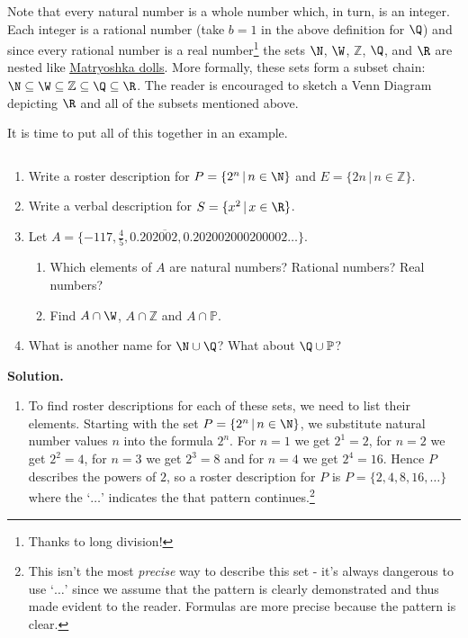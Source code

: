 Note that every natural number is a whole number which, in turn, is an integer.   Each integer is a rational number (take $b =1$ in the above definition for $\Q$) and since every rational number is a real number\footnote{Thanks to long division!}  the sets $\N$, $\W$, $\mathbb Z$, $\Q$, and  $\R$ are nested like \href{http://en.wikipedia.org/wiki/Matryoshka_doll}{\underline{Matryoshka dolls}}. More formally, these sets form a subset chain:  $\N \subseteq \W \subseteq \mathbb Z \subseteq \Q \subseteq \R$.  The reader is encouraged to sketch a Venn Diagram depicting $\R$ and all of the subsets mentioned above.  

It is time to put all of this together in an example.

\begin{ex} \label{numbersetex}   $~$

\begin{enumerate}

\item  Write a roster description for $P = \{ 2^{n} \, | \, n \in \N \}$  and $E = \{ 2n \, | \, n \in \mathbb Z \}$.

\item Write a verbal description for $S = \{ x^2 \, | \, x \in \R \}$.

\item Let $A = \{-117, \frac{4}{5}, 0.20\overline{2002}, 0.202002000200002 \ldots\}$. 

\begin{enumerate}

\item Which elements of $A$ are natural numbers?  Rational numbers?  Real numbers?

\item Find $A \cap \W$, $A \cap \mathbb Z$ and $A \cap \mathbb P$.

\end{enumerate}

\item  What is another name for $\N \cup \Q$?  What about  $\Q \cup \mathbb P$?

\end{enumerate}

{\bf Solution.}

\begin{enumerate}

\item  To find roster descriptions for each of these sets, we need to list their elements.   Starting with the set $P = \{ 2^{n} \, | \, n \in \N \}$, we substitute natural number values $n$ into the formula $2^n$.  For $n = 1$ we get $2^1 = 2$,  for $n = 2$ we get $2^2 = 4$, for $n = 3$ we get $2^3 = 8$ and for $n = 4$ we get $2^4 = 16$.  Hence  $P$ describes the powers of $2$, so a roster description for $P$ is $P = \{ 2, 4, 8, 16, \ldots \}$ where the `$\ldots$' indicates the that pattern continues.\footnote{This isn't the most \textit{precise} way to describe this set - it's always dangerous to use `$\ldots$' since we assume that the pattern is clearly demonstrated and thus made evident to the reader.  Formulas are more precise because the pattern is clear.}  


\end{enumerate}
\end{ex}
